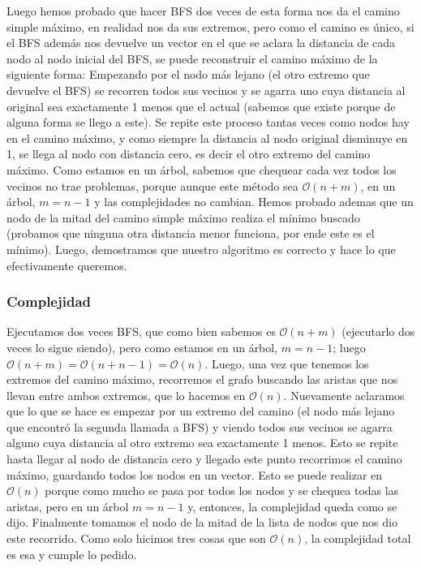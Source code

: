 \documentclass[A4paper,oneside,fleqn,11pt]{article}
\theoremstyle{definition}
\begin{document}
Luego hemos probado que hacer BFS dos veces de esta forma nos da el camino simple máximo, en realidad nos da sus extremos, pero como el camino es único, si el BFS además nos devuelve un vector en el que se aclara la distancia de cada nodo al nodo inicial del BFS, se puede reconstruir el camino máximo de la siguiente forma: Empezando por el nodo más lejano (el otro extremo que devuelve el BFS) se recorren todos sus vecinos y se agarra uno cuya distancia al original sea exactamente 1 menos que el actual (sabemos que existe porque de alguna forma se llego a este). Se repite este proceso tantas veces como nodos hay en el camino máximo, y como siempre la distancia al nodo original disminuye en 1, se llega al nodo con distancia cero, es decir el otro extremo del camino máximo. Como estamos en un árbol, sabemos que chequear cada vez todos los vecinos no trae problemas, porque aunque este método sea $\mathcal{O} (n+m)$, en un árbol, $m=n-1$ y las complejidades no cambian. Hemos probado ademas que un nodo de la mitad del camino simple máximo realiza el mínimo buscado (probamos que ninguna otra distancia menor funciona, por ende este es el mínimo). Luego, demostramos que nuestro algoritmo es correcto y hace lo que efectivamente queremos.

\subsubsection{Complejidad}

Ejecutamos dos veces BFS, que como bien sabemos es $\mathcal{O} (n+m)$ (ejecutarlo dos veces lo sigue siendo), pero como estamos en un árbol, $m=n-1$; luego $\mathcal{O} (n+m) =\mathcal{O} (n+n-1)=\mathcal{O} (n)$. Luego, una vez que tenemos los extremos del camino máximo, recorremos el grafo buscando las aristas que nos llevan entre ambos extremos, que lo hacemos en $\mathcal{O} (n)$. Nuevamente aclaramos que lo que se hace es empezar por un extremo del camino (el nodo más lejano que encontró la segunda llamada a BFS) y viendo todos sus vecinos se agarra alguno cuya distancia al otro extremo sea exactamente 1 menos. Esto se repite hasta llegar al nodo de distancia cero y llegado este punto recorrimos el camino máximo, guardando todos los nodos en un vector. Esto se puede realizar en $\mathcal{O} (n)$ porque como mucho se pasa por todos los nodos y se chequea todas las aristas, pero en un árbol $m=n-1$ y, entonces, la complejidad queda como se dijo. Finalmente tomamos el nodo de la mitad de la lista de nodos que nos dio este recorrido. Como solo hicimos tres cosas que son $\mathcal{O} (n)$, la complejidad total es esa y cumple lo pedido.
\end{document}
